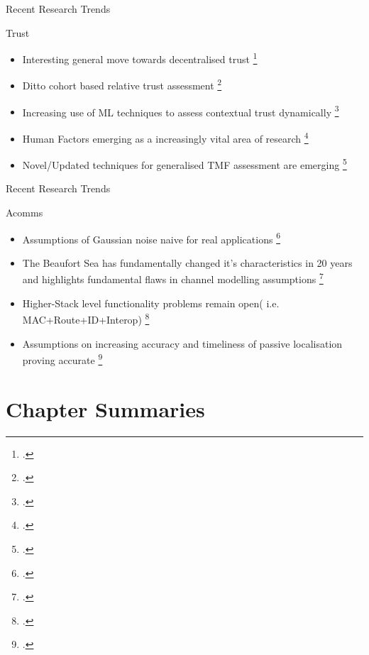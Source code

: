 \documentclass[aspectratio=169]{beamer}
\begin{document}
\begin{frame}{Recent Research Trends}
	\begin{block}{Trust}
		\begin{itemize}
			\item Interesting general move towards decentralised trust \footcite{Korzun2015}
			\item Ditto cohort based relative trust assessment \footcite{Singh2016}
			\item Increasing use of ML techniques to assess contextual trust dynamically \footcite{Rishwaraj2017} 
			\item Human Factors emerging as a increasingly vital area of research \footcite{Saeidi2009,Matthews2016,Lahijanian2016}
			\item Novel/Updated techniques for generalised TMF assessment are emerging \footcite{Janiszewski2016} 
		\end{itemize}
	\end{block}
	
\end{frame}

\begin{frame}{Recent Research Trends}
	\begin{block}{Acomms} %
		\begin{itemize}
			\item Assumptions of Gaussian noise naive for real applications \footcite{Mahmood2016, Deane2016}
			\item The Beaufort Sea has fundamentally changed it's characteristics in 20 years and highlights fundamental flaws in channel modelling assumptions \footcite{Schmidt2016}
			\item Higher-Stack level functionality problems remain open( i.e. MAC+Route+ID+Interop) \footcite{Diamant2016,Petroccia2016,Petroccia2016a, Anjangi2016}
			\item Assumptions on increasing accuracy and timeliness of passive localisation proving accurate \footcite{Vio2016, Ferreira2016,Das2016}
		\end{itemize}
	\end{block}
	
\end{frame}

\section{Chapter Summaries}
\end{document}
